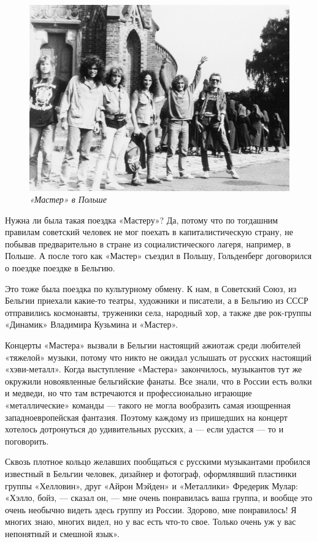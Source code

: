 \documentclass[16pt,a5paper,oneside]{book}
\begin{document}
\begin{figure}
    \centering
    \includegraphics[scale=0.8]{Image22}
    \caption{\textit{«Мастер» в Польше}}
\end{figure}

Нужна ли была такая поездка «Мастеру»? Да, потому что по тогдашним правилам советский человек не мог поехать в
капиталистическую страну, не побывав предварительно в стране из социалистического лагеря, например, в Польше. А после
того как «Мастер» съездил в Польшу, Гольденберг договорился о поездке поездке в Бельгию.

Это тоже была поездка по культурному обмену. К нам, в Советский Союз, из Бельгии приехали какие-то театры, художники и
писатели, а в Бельгию из СССР отправились космонавты, труженики села, народный хор, а также две рок-группы «Динамик»
Владимира Кузьмина и «Мастер».

Концерты «Мастера» вызвали в Бельгии настоящий ажиотаж среди любителей «тяжелой» музыки, потому что никто не ожидал
услышать от русских настоящий «хэви-металл». Когда выступление «Мастера» закончилось, музыкантов тут же окружили
новоявленные бельгийские фанаты. Все знали, что в России есть волки и медведи, но что там встречаются и профессионально
играющие «металлические» команды — такого не могла вообразить самая изощренная западноевропейская фантазия. Поэтому
каждому из пришедших на концерт хотелось дотронуться до удивительных русских, а — если удастся — то и поговорить.

Сквозь плотное кольцо желавших пообщаться с русскими музыкантами пробился известный в Бельгии человек, дизайнер и
фотограф, оформлявший пластинки группы «Хелловин», друг «Айрон Мэйден» и «Металлики» Фредерик Мулар: «Хэлло, бойз, —
сказал он, — мне очень понравилась ваша группа, и вообще это очень необычно видеть здесь группу из России. Здорово, мне
понравилось! Я многих знаю, многих видел, но у вас есть что-то свое. Только очень уж у вас непонятный и смешной язык».
\end{document}
